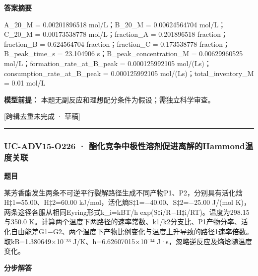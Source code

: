 \documentclass[UTF8,11pt,a4paper]{ctexart}
\begin{document}
\noindent\textbf{答案摘要}\par
A\_20\_M = 0.00201896518 mol/L；B\_20\_M = 0.00624564704 mol/L；C\_20\_M = 0.00173538778 mol/L；fraction\_A = 0.201896518 fraction；fraction\_B = 0.624564704 fraction；fraction\_C = 0.173538778 fraction；B\_peak\_time\_s = 23.104906 s；B\_peak\_concentration\_M = 0.00629960525 mol/L；formation\_rate\_at\_B\_peak = 0.000125992105 mol/(Ls)；consumption\_rate\_at\_B\_peak = 0.000125992105 mol/(Ls)；total\_inventory\_M = 0.01 mol/L\par
\noindent\textbf{模型前提：}
本题无副反应和理想配分条件为假设；需独立科学审查。\par
\noindent\textcolor{red!65!black}{[跨辑去重未完成 · 草稿]} \par
\medskip\hrule\medskip
{}
\subsubsection*{UC-ADV15-O226 · 酯化竞争中极性溶剂促进离解的Hammond温度关联}
\noindent\textbf{题目}\par
某芳香酯发生两条不可逆平行裂解路径生成不同产物P1、P2，分别具有活化焓H‡1=55.00、H‡2=60.00 kJ/mol，活化熵S‡1=−40.00、S‡2=−25.00 J/(mol K)，两条途径各服从相同Eyring形式k\_i=kBT/h exp(S‡i/R−H‡i/RT)。温度为298.15与350.0 K。计算两个温度下两路径的速率常数、k1/k2分支比、P1产物分率、活化自由能差G1−G2、两个温度下产物比例变化与温度上升导致的路径1速率倍数。取kB=1.380649×10⁻²³ J/K、h=6.62607015×10⁻³⁴ J·s，忽略逆反应及熵焓随温度变化。\par
\medskip\noindent\textbf{分步解答}
\end{document}
